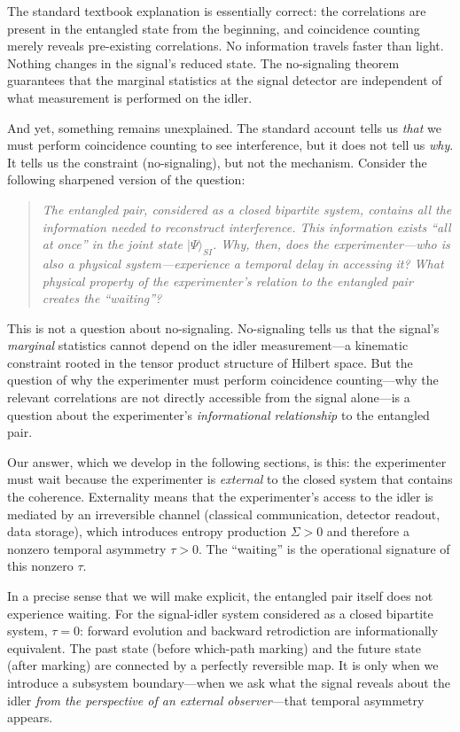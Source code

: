 \documentclass[12pt]{article}
\theoremstyle{definition}
\theoremstyle{remark}
\newcommand{\ket}[1]{|#1\rangle}
\newcommand{\tauasym}{\tau}
\begin{document}
The standard textbook explanation is essentially correct: the
correlations are present in the entangled state from the beginning,
and coincidence counting merely reveals pre-existing correlations.
No information travels faster than light.  Nothing changes in the
signal's reduced state.  The no-signaling theorem~\cite{Ghirardi1980}
guarantees that the marginal statistics at the signal detector are
independent of what measurement is performed on the idler.

And yet, something remains unexplained.  The standard account tells us
\emph{that} we must perform coincidence counting to see interference,
but it does not tell us \emph{why}.  It tells us the constraint
(no-signaling), but not the mechanism.  Consider the following
sharpened version of the question:

\begin{quote}
\emph{The entangled pair, considered as a closed bipartite system,
contains all the information needed to reconstruct interference.
This information exists ``all at once'' in the joint state
$\ket{\Psi}_{SI}$.  Why, then, does the experimenter---who is
also a physical system---experience a temporal delay in accessing it?
What physical property of the experimenter's relation to the
entangled pair creates the ``waiting''?}
\end{quote}

This is not a question about no-signaling.  No-signaling tells us that
the signal's \emph{marginal} statistics cannot depend on the idler
measurement---a kinematic constraint rooted in the tensor product
structure of Hilbert space.  But the question of why the experimenter
must perform coincidence counting---why the relevant correlations are
not directly accessible from the signal alone---is a question about
the experimenter's \emph{informational relationship} to the entangled pair.

Our answer, which we develop in the following sections, is this:
the experimenter must wait because the experimenter is \emph{external}
to the closed system that contains the coherence.  Externality means
that the experimenter's access to the idler is mediated by an
irreversible channel (classical communication, detector readout,
data storage), which introduces entropy production $\Sigma > 0$ and
therefore a nonzero temporal asymmetry $\tauasym > 0$.  The
``waiting'' is the operational signature of this nonzero $\tauasym$.

In a precise sense that we will make explicit, the entangled pair
itself does not experience waiting.  For the signal-idler system
considered as a closed bipartite system, $\tauasym = 0$: forward
evolution and backward retrodiction are informationally equivalent.
The past state (before which-path marking) and the future state
(after marking) are connected by a perfectly reversible map.
It is only when we introduce a subsystem boundary---when we ask
what the signal reveals about the idler \emph{from the perspective
of an external observer}---that temporal asymmetry appears.
\end{document}
